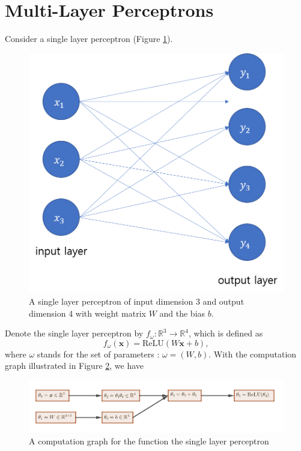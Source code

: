 \documentclass[12pt]{report}
\numberwithin{figure}{chapter}
\theoremstyle{plain}
\theoremstyle{definition}
\theoremstyle{corollary}
\theoremstyle{definition}
\theoremstyle{plain}
\theoremstyle{definition}
\theoremstyle{plain}
\newcommand\bx{\ensuremath{\boldsymbol x}}
\begin{document}
\section{Multi-Layer Perceptrons}
Consider a single layer perceptron (Figure \ref{SLP}).
\begin{figure}[t]
\centering
\includegraphics[width=.4\textwidth]{SLP}
\caption{A single layer perceptron of input dimension 3 and output dimension 4 with weight matrix \(W\) and the bias \(b\).}
\label{SLP}
\end{figure}
Denote the single layer perceptron by \(f_\omega:\mathbb R^3\to\mathbb R^4\), which is defined as
\[f_\omega(\bx)=\text{ReLU}(W\bx+b),\]
where \(\omega\) stands for the set of parameters : \(\omega=(W,b)\).
With the computation graph illustrated in Figure \ref{computation_graph_2}, we have
\begin{figure}[t]
\centering
\includegraphics[width=\textwidth]{computation_graph_2}
\caption{A computation graph for the function the single layer perceptron}
\label{computation_graph_2}
\end{figure}
\end{document}
